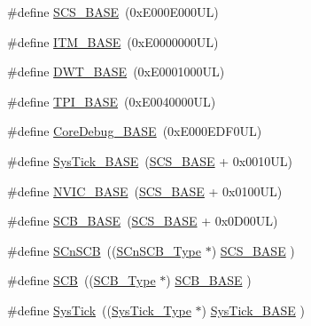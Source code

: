 \begin{DoxyCompactItemize}
\item 
\#define \hyperlink{group___c_m_s_i_s__core__base_ga3c14ed93192c8d9143322bbf77ebf770}{S\+C\+S\+\_\+\+B\+A\+SE}~(0x\+E000\+E000\+U\+L)
\item 
\#define \hyperlink{group___c_m_s_i_s__core__base_gadd76251e412a195ec0a8f47227a8359e}{I\+T\+M\+\_\+\+B\+A\+SE}~(0x\+E0000000\+U\+L)
\item 
\#define \hyperlink{group___c_m_s_i_s__core__base_gafdab534f961bf8935eb456cb7700dcd2}{D\+W\+T\+\_\+\+B\+A\+SE}~(0x\+E0001000\+U\+L)
\item 
\#define \hyperlink{group___c_m_s_i_s__core__base_ga2b1eeff850a7e418844ca847145a1a68}{T\+P\+I\+\_\+\+B\+A\+SE}~(0x\+E0040000\+U\+L)
\item 
\#define \hyperlink{group___c_m_s_i_s__core__base_ga680604dbcda9e9b31a1639fcffe5230b}{Core\+Debug\+\_\+\+B\+A\+SE}~(0x\+E000\+E\+D\+F0\+U\+L)
\item 
\#define \hyperlink{group___c_m_s_i_s__core__base_ga58effaac0b93006b756d33209e814646}{Sys\+Tick\+\_\+\+B\+A\+SE}~(\hyperlink{group___c_m_s_i_s__core__base_ga3c14ed93192c8d9143322bbf77ebf770}{S\+C\+S\+\_\+\+B\+A\+SE} +  0x0010\+U\+L)
\item 
\#define \hyperlink{group___c_m_s_i_s__core__base_gaa0288691785a5f868238e0468b39523d}{N\+V\+I\+C\+\_\+\+B\+A\+SE}~(\hyperlink{group___c_m_s_i_s__core__base_ga3c14ed93192c8d9143322bbf77ebf770}{S\+C\+S\+\_\+\+B\+A\+SE} +  0x0100\+U\+L)
\item 
\#define \hyperlink{group___c_m_s_i_s__core__base_gad55a7ddb8d4b2398b0c1cfec76c0d9fd}{S\+C\+B\+\_\+\+B\+A\+SE}~(\hyperlink{group___c_m_s_i_s__core__base_ga3c14ed93192c8d9143322bbf77ebf770}{S\+C\+S\+\_\+\+B\+A\+SE} +  0x0\+D00\+U\+L)
\item 
\#define \hyperlink{group___c_m_s_i_s__core__base_ga9fe0cd2eef83a8adad94490d9ecca63f}{S\+Cn\+S\+CB}~((\hyperlink{struct_s_cn_s_c_b___type}{S\+Cn\+S\+C\+B\+\_\+\+Type}    $\ast$)     \hyperlink{group___c_m_s_i_s__core__base_ga3c14ed93192c8d9143322bbf77ebf770}{S\+C\+S\+\_\+\+B\+A\+SE}      )
\item 
\#define \hyperlink{group___c_m_s_i_s__core__base_gaaaf6477c2bde2f00f99e3c2fd1060b01}{S\+CB}~((\hyperlink{struct_s_c_b___type}{S\+C\+B\+\_\+\+Type}       $\ast$)     \hyperlink{group___c_m_s_i_s__core__base_gad55a7ddb8d4b2398b0c1cfec76c0d9fd}{S\+C\+B\+\_\+\+B\+A\+SE}      )
\item 
\#define \hyperlink{group___c_m_s_i_s__core__base_gacd96c53beeaff8f603fcda425eb295de}{Sys\+Tick}~((\hyperlink{struct_sys_tick___type}{Sys\+Tick\+\_\+\+Type}   $\ast$)     \hyperlink{group___c_m_s_i_s__core__base_ga58effaac0b93006b756d33209e814646}{Sys\+Tick\+\_\+\+B\+A\+SE}  )

\end{DoxyCompactItemize}

